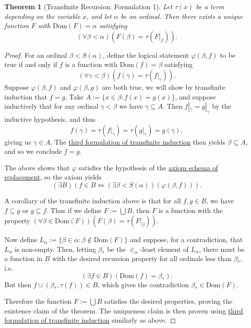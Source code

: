 \documentclass[a4paper,11pt]{article}
\theoremstyle{plain}
\newtheorem{thm}{Theorem}[subsection]
\theoremstyle{definition}
\theoremstyle{remark}
\begin{document}
\begin{thm}[Transfinite Recursion: Formulation 1]
\label{thm:Trecursion1}
Let $\tau(x)$ be a term depending on the variable $x$, and let $\alpha$ be an ordinal. Then there exists a unique function $F$ with $\mathrm{Dom}(F) = \alpha$ satisfying
\[(\forall\beta<\alpha)(F(\beta) = \tau(F|_\beta)).\]
\end{thm}
\begin{proof}
For an ordinal $\beta < S(\alpha)$, define the logical statement $\varphi(\beta,f)$ to be true if and only if $f$ is a function with $\mathrm{Dom}(f) = \beta$ satisfying
\[(\forall \gamma < \beta)(f(\gamma) = \tau(f|_\gamma)).\]
Suppose $\varphi(\beta,f)$ and $\varphi(\beta,g)$ are both true, we will show by transfinite induction that $f=g$. Take $A := \{x \in \beta : f(x) = g(x)\}$, and suppose inductively that for any ordinal $\gamma < \beta$ we have $\gamma\subseteq A$. Then $f|_\gamma = g|_\gamma$ by the inductive hypothesis, and thus
\[f(\gamma) = \tau(f|_\gamma) = \tau(g|_\gamma) = g(\gamma),\]
giving us $\gamma\in A$. The \hyperref[thm:Tinduction3]{third formulation of transfinite induction} then yields $\beta\subseteq A$, and so we conclude $f = g$.

The above shows that $\varphi$ satisfies the hypothesis of the \hyperref[axiom:replacement]{axiom schema of replacement}, so the axiom yields
\[(\exists B)(f\in B \iff (\exists\beta<S(\alpha))(\varphi(\beta,f))).\]

A corollary of the transfinite induction above is that for all $f,g\in B$, we have $f\subseteq g$ or $g\subseteq f$. Thus if we define $F := \bigcup B$, then $F$ is a function with the property $(\forall\beta\in\mathrm{Dom}(F))(F(\beta) = \tau(F|_\beta))$.

Now define $L_\alpha := \{\beta\in\alpha : \beta\notin\mathrm{Dom}(F)\}$ and suppose, for a contradiction, that $L_\alpha$ is non-empty. Then, letting $\beta_*$ be the $\in_\alpha$-least element of $L_\alpha$, there must be a function in $B$ with the desired recursion property for all ordinals less than $\beta_*$, i.e.
\[(\exists f\in B)(\mathrm{Dom}(f) = \beta_*).\]
But then $f \cup (\beta_*, \tau(f)) \in B$, which gives the contradiction $\beta_* \in \mathrm{Dom}(F)$.

Therefore the function $F := \bigcup B$ satisfies the desired properties, proving the existence claim of the theorem. The uniqueness claim is then proven using \hyperref[thm:Tinduction3]{third formulation of transfinite induction} similarly as above.
\end{proof}
\end{document}
